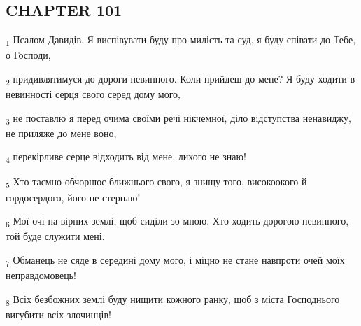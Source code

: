 \subsection{CHAPTER 101}
\begin{tcolorbox}
\textsubscript{1} Псалом Давидів. Я виспівувати буду про милість та суд, я буду співати до Тебе, о Господи,
\end{tcolorbox}
\begin{tcolorbox}
\textsubscript{2} придивлятимуся до дороги невинного. Коли прийдеш до мене? Я буду ходити в невинності серця свого серед дому мого,
\end{tcolorbox}
\begin{tcolorbox}
\textsubscript{3} не поставлю я перед очима своїми речі нікчемної, діло відступства ненавиджу, не приляже до мене воно,
\end{tcolorbox}
\begin{tcolorbox}
\textsubscript{4} перекірливе серце відходить від мене, лихого не знаю!
\end{tcolorbox}
\begin{tcolorbox}
\textsubscript{5} Хто таємно обчорнює ближнього свого, я знищу того, високоокого й гордосердого, його не стерплю!
\end{tcolorbox}
\begin{tcolorbox}
\textsubscript{6} Мої очі на вірних землі, щоб сиділи зо мною. Хто ходить дорогою невинного, той буде служити мені.
\end{tcolorbox}
\begin{tcolorbox}
\textsubscript{7} Обманець не сяде в середині дому мого, і міцно не стане навпроти очей моїх неправдомовець!
\end{tcolorbox}
\begin{tcolorbox}
\textsubscript{8} Всіх безбожних землі буду нищити кожного ранку, щоб з міста Господнього вигубити всіх злочинців!
\end{tcolorbox}
